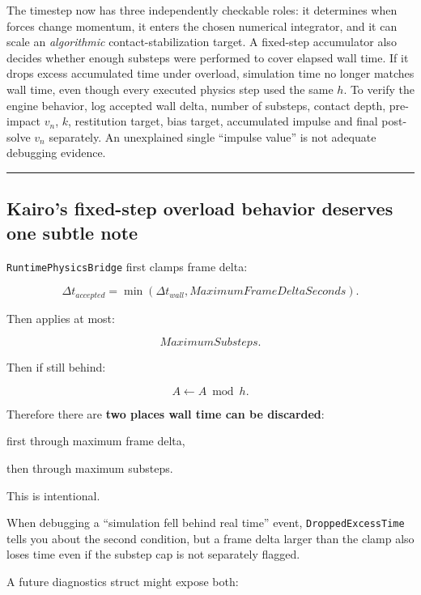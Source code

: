 The timestep now has three independently checkable roles: it determines when forces change momentum, it enters the chosen numerical integrator, and it can scale an \emph{algorithmic} contact-stabilization target. A fixed-step accumulator also decides whether enough substeps were performed to cover elapsed wall time. If it drops excess accumulated time under overload, simulation time no longer matches wall time, even though every executed physics step used the same \(h\). To verify the engine behavior, log accepted wall delta, number of substeps, contact depth, pre-impact \(v_n\), \(k\), restitution target, bias target, accumulated impulse and final post-solve \(v_n\) separately. An unexplained single ``impulse value'' is not adequate debugging evidence.

\begin{center}\rule{0.5\linewidth}{0.5pt}\end{center}

\subsection{Kairo's fixed-step overload behavior deserves one subtle note}\label{06-engine-ii-ch038-kairos-fixed-step-overload-behavior-deserves-one-subtle-note}

\hypertarget{06-engine-ii-ch038-kairos-fixed-step-overload-behavior-deserves-one-subtle-note}{}

\texttt{RuntimePhysicsBridge} first clamps frame delta:

\[
\Delta t_{accepted}
=
\min(
\Delta t_{wall},
MaximumFrameDeltaSeconds).
\]

Then applies at most:

\[
MaximumSubsteps.
\]

Then if still behind:

\[
A\leftarrow A\bmod h.
\]

Therefore there are \textbf{two places wall time can be discarded}:

first through maximum frame delta,

then through maximum substeps.

This is intentional.

When debugging a ``simulation fell behind real time'' event, \texttt{DroppedExcessTime} tells you about the second condition, but a frame delta larger than the clamp also loses time even if the substep cap is not separately flagged.

A future diagnostics struct might expose both:


